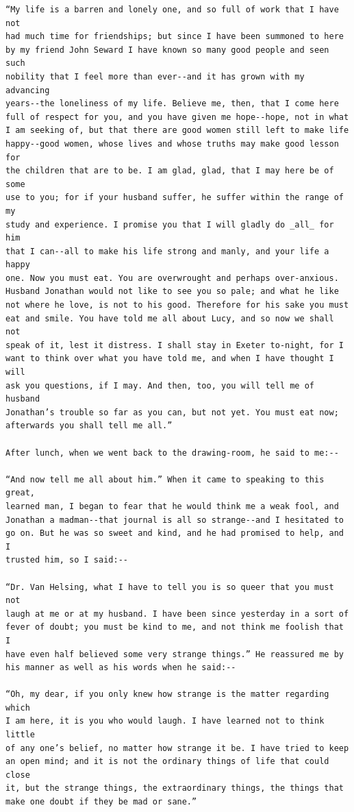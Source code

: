 \documentclass{article}
\begin{document}
\begin{verbatim}
“My life is a barren and lonely one, and so full of work that I have not
had much time for friendships; but since I have been summoned to here
by my friend John Seward I have known so many good people and seen such
nobility that I feel more than ever--and it has grown with my advancing
years--the loneliness of my life. Believe me, then, that I come here
full of respect for you, and you have given me hope--hope, not in what
I am seeking of, but that there are good women still left to make life
happy--good women, whose lives and whose truths may make good lesson for
the children that are to be. I am glad, glad, that I may here be of some
use to you; for if your husband suffer, he suffer within the range of my
study and experience. I promise you that I will gladly do _all_ for him
that I can--all to make his life strong and manly, and your life a happy
one. Now you must eat. You are overwrought and perhaps over-anxious.
Husband Jonathan would not like to see you so pale; and what he like
not where he love, is not to his good. Therefore for his sake you must
eat and smile. You have told me all about Lucy, and so now we shall not
speak of it, lest it distress. I shall stay in Exeter to-night, for I
want to think over what you have told me, and when I have thought I will
ask you questions, if I may. And then, too, you will tell me of husband
Jonathan’s trouble so far as you can, but not yet. You must eat now;
afterwards you shall tell me all.”

After lunch, when we went back to the drawing-room, he said to me:--

“And now tell me all about him.” When it came to speaking to this great,
learned man, I began to fear that he would think me a weak fool, and
Jonathan a madman--that journal is all so strange--and I hesitated to
go on. But he was so sweet and kind, and he had promised to help, and I
trusted him, so I said:--

“Dr. Van Helsing, what I have to tell you is so queer that you must not
laugh at me or at my husband. I have been since yesterday in a sort of
fever of doubt; you must be kind to me, and not think me foolish that I
have even half believed some very strange things.” He reassured me by
his manner as well as his words when he said:--

“Oh, my dear, if you only knew how strange is the matter regarding which
I am here, it is you who would laugh. I have learned not to think little
of any one’s belief, no matter how strange it be. I have tried to keep
an open mind; and it is not the ordinary things of life that could close
it, but the strange things, the extraordinary things, the things that
make one doubt if they be mad or sane.”


\end{verbatim}
\end{document}
